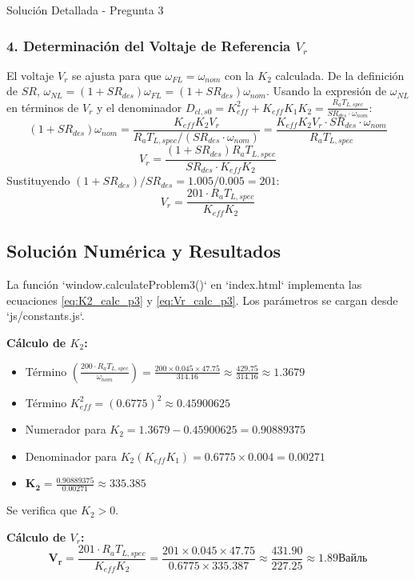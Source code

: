\documentclass[12pt]{article}
\begin{document}
\begin{solutionbox}{Solución Detallada - Pregunta 3}
\subsubsection*{4. Determinación del Voltaje de Referencia $V_r$}
El voltaje $V_r$ se ajusta para que $\omega_{FL} = \omega_{nom}$ con la $K_2$ calculada. De la definición de $SR$, $\omega_{NL} = (1+SR_{des})\omega_{FL} = (1+SR_{des})\omega_{nom}$.
Usando la expresión de $\omega_{NL}$ en términos de $V_r$ y el denominador $D_{cl,s0} = K_{eff}^2 + K_{eff}K_1K_2 = \frac{R_a T_{L,spec}}{SR_{des} \cdot \omega_{nom}}$:\n
\[ (1+SR_{des})\omega_{nom} = \frac{K_{eff}K_2 V_r}{R_a T_{L,spec} / (SR_{des} \cdot \omega_{nom})} = \frac{K_{eff}K_2 V_r \cdot SR_{des} \cdot \omega_{nom}}{R_a T_{L,spec}} \]
\[ V_r = \frac{(1+SR_{des}) R_a T_{L,spec}}{SR_{des} \cdot K_{eff} K_2} \]
Sustituyendo $(1+SR_{des})/SR_{des} = 1.005/0.005 = 201$:\n
\begin{equation}\label{eq:Vr_calc_p3}
    V_r = \frac{201 \cdot R_a T_{L,spec}}{K_{eff} K_2}
\end{equation}

\subsection*{Solución Numérica y Resultados}
La función `window.calculateProblem3()` en `index.html` implementa las ecuaciones \eqref{eq:K2_calc_p3} y \eqref{eq:Vr_calc_p3}. Los parámetros se cargan desde `js/constants.js`.\n

\textbf{Cálculo de $K_2$:}
\begin{itemize}
    \item Término $\left( \frac{200 \cdot R_a T_{L,spec}}{\omega_{nom}} \right) = \frac{200 \times 0.045 \times 47.75}{314.16} \approx \frac{429.75}{314.16} \approx 1.3679$
    \item Término $K_{eff}^2 = (0.6775)^2 \approx 0.45900625$
    \item Numerador para $K_2 = 1.3679 - 0.45900625 = 0.90889375$
    \item Denominador para $K_2 (K_{eff}K_1) = 0.6775 \times 0.004 = 0.00271$
    \item $\mathbf{K_2} = \frac{0.90889375}{0.00271} \approx \mathbf{335.385}$
\end{itemize}
Se verifica que $K_2 > 0$.\n

\textbf{Cálculo de $V_r$:}
\[ \mathbf{V_r} = \frac{201 \cdot R_a T_{L,spec}}{K_{eff} K_2} = \frac{201 \times 0.045 \times 47.75}{0.6775 \times 335.387} \approx \frac{431.90}{227.25} \approx \mathbf{1.89 Вайль} \]


\end{solutionbox}
\end{document}

